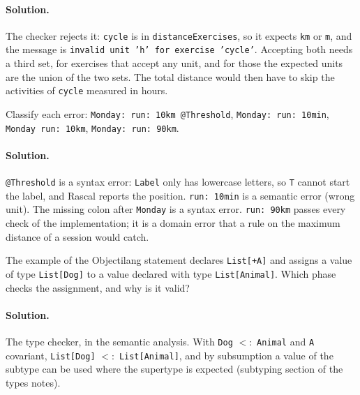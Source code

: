 \paragraph{Solution.} The checker rejects it: \texttt{cycle} is in
\texttt{distanceExercises}, so it expects \texttt{km} or \texttt{m}, and the
message is \texttt{invalid unit 'h' for exercise 'cycle'}. Accepting both
needs a third set, for exercises that accept any unit, and for those the
expected units are the union of the two sets. The total distance would then
have to skip the activities of \texttt{cycle} measured in hours.

\begin{exercise}
Classify each error: \texttt{Monday: run: 10km @Threshold},
\texttt{Monday: run: 10min}, \texttt{Monday run: 10km}, \texttt{Monday: run: 90km}.
\end{exercise}

\paragraph{Solution.} \texttt{@Threshold} is a syntax error: \texttt{Label} only
has lowercase letters, so \texttt{T} cannot start the label, and Rascal reports
the position. \texttt{run: 10min} is a semantic error (wrong unit). The missing
colon after \texttt{Monday} is a syntax error. \texttt{run: 90km} passes every
check of the implementation; it is a domain error that a rule on the maximum
distance of a session would catch.

\begin{exercise}
The example of the Objectilang statement declares \texttt{List[+A]} and
assigns a value of type \texttt{List[Dog]} to a value declared with type
\texttt{List[Animal]}. Which phase checks the assignment, and why is it valid?
\end{exercise}

\paragraph{Solution.} The type checker, in the semantic analysis. With
\texttt{Dog} $<:$ \texttt{Animal} and \texttt{A} covariant,
\texttt{List[Dog]} $<:$ \texttt{List[Animal]}, and by subsumption a value of the
subtype can be used where the supertype is expected (subtyping section of the
types notes).
